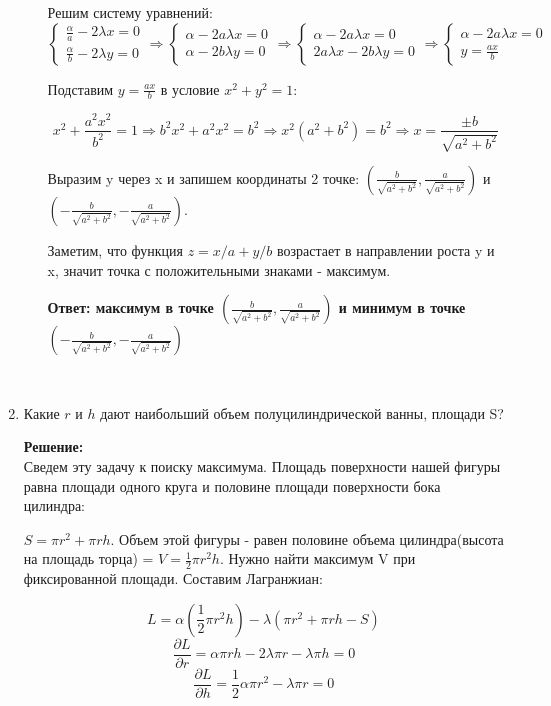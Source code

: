 \documentclass[a4paper,12pt]{article}
\newcounter{z}
\begin{document}
\begin{enumerate}
\begin{enumerate}
Решим систему уравнений:
$$\begin{cases} \frac{\alpha}{a} -2\lambda x =0 \\ \frac{\alpha}{b} -2\lambda y =0\end{cases} \Rightarrow \begin{cases} \alpha -2a\lambda x =0 \\ \alpha -2b\lambda y =0\end{cases}\Rightarrow \begin{cases} \alpha -2a\lambda x =0 \\ 2a\lambda x -2b\lambda y =0\end{cases}\Rightarrow \begin{cases} \alpha -2a\lambda x =0 \\y=\frac{ax}{b} \end{cases} $$

Подставим $y=\frac{ax}{b}$ в условие $x^2 + y^2=1$:

$$x^2 +\frac{a^2x^2}{b^2}=1 \Rightarrow b^2x^2 +a^2x^2=b^2 \Rightarrow x^2(a^2+b^2) =b^2\Rightarrow x=\frac{ \pm b}{\sqrt{a^2+b^2}}$$

Выразим y через x и запишем координаты 2 точке: $(\frac{ b}{\sqrt{a^2+b^2}},\frac{ a}{\sqrt{a^2+b^2}})$ и $(-\frac{ b}{\sqrt{a^2+b^2}},-\frac{ a}{\sqrt{a^2+b^2}})$. 

Заметим, что функция $z=x/a+y/b$ возрастает в направлении роста y и x, значит точка с положительными знаками - максимум.

\textbf{Ответ: максимум в точке $(\frac{ b}{\sqrt{a^2+b^2}},\frac{ a}{\sqrt{a^2+b^2}})$ и минимум в точке $(-\frac{ b}{\sqrt{a^2+b^2}},-\frac{ a}{\sqrt{a^2+b^2}})$}

\end{enumerate}

\ 

\item Какие $r$ и $h$ дают наибольший объем полуцилиндрической ванны, площади S?

\textbf{Решение:}\\
Сведем эту задачу к поиску максимума.
Площадь поверхности нашей фигуры равна площади одного круга и половине площади поверхности бока цилиндра: 

$S=\pi r^2 +\pi r h$.
Объем этой фигуры - равен половине объема цилиндра(высота на площадь торца) = $V=\frac{1}{2}\pi r^2 h$.
Нужно найти максимум V при фиксированной площади.
Составим Лагранжиан:

$$L= \alpha(\frac{1}{2}\pi r^2 h)-\lambda(\pi r^2 +\pi r h -S)$$
$$\frac{\partial L}{\partial r} =\alpha \pi r h - 2\lambda \pi r - \lambda \pi h =0$$
$$\frac{\partial L}{\partial h} = \frac{1}{2}\alpha \pi r^2 - \lambda \pi r =0$$


\end{enumerate}
\end{document}
